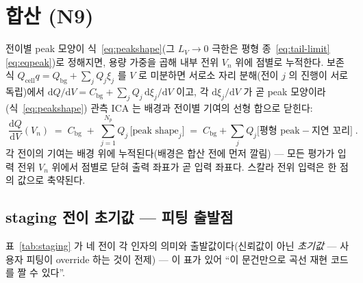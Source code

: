 \documentclass[11pt,a4paper]{article}
\newcommand{\dd}{\mathrm{d}}
\newcommand{\cell}{\mathrm{cell}}
\newcommand{\bg}{\mathrm{bg}}
\begin{document}
\section{합산 (N9)}\label{sec:sum}
전이별 peak 모양이 식~\eqref{eq:peakshape}(그 $L_V\to0$ 극한은 평형 종~\eqref{eq:tail-limit}\eqref{eq:eqpeak})로 정해지면, 용량 가중을 곱해 내부 전위 $V_n$ 위에 점별로 누적한다. 보존식 $Q_\cell q=Q_\bg+\sum_jQ_j\xi_j$ 를
$V$ 로 미분하면 서로소 자리 분해(전이 $j$ 의 진행이 서로 독립)에서 $\dd Q/\dd V=C_\bg+\sum_jQ_j\,\dd\xi_j/\dd V$ 이고,
각 $\dd\xi_j/\dd V$ 가 곧 peak 모양이라(식~\eqref{eq:peakshape}) 관측 ICA 는 배경과 전이별 기여의 선형 합으로 닫힌다:
\begin{equation}
\boxed{\;\frac{\dd Q}{\dd V}(V_n)\;=\;C_\bg\;+\;\sum_{j=1}^{N_p}Q_j\,
\big[\text{peak shape}_j\big]
\;=\;C_\bg+\sum_jQ_j\big[\text{평형 peak}-\text{지연 꼬리}\big]\;.}
\label{eq:sum}
\end{equation}
각 전이의 기여는 배경 위에 누적된다(배경은 합산 전에 먼저 깔림) --- 모든 평가가 입력 전위 $V_n$ 위에서 점별로 닫혀 출력 좌표가 곧 입력 좌표다. 스칼라 전위 입력은 한 점의 값으로 축약된다.

\subsection{staging 전이 초기값 — 피팅 출발점}
표~\ref{tab:staging} 가 네 전이 각 인자의 의미와 출발값이다(신뢰값이 아닌 \emph{초기값} — 사용자 피팅이
override 하는 것이 전제) — 이 표가 있어 ``이 문건만으로 곡선 재현 코드를 짤 수 있다''.
\end{document}
